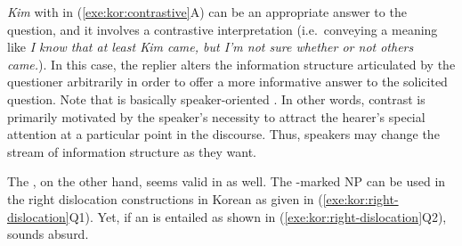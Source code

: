


\noindent \textit{Kim} with \nun in (\ref{exe:kor:contrastive}A) can
be an appropriate answer to the question, and it involves a
contrastive interpretation (i.e.\ conveying a meaning like \textit{I
  know that at least Kim came, but I'm not sure whether or not others
  came.}).  In this case, the replier alters the information
structure articulated by the questioner arbitrarily in order to offer
a more informative answer to the solicited question. Note that
 is basically speaker-oriented \citep{chang:02}. In
other words, contrast is primarily motivated by the speaker's
necessity to attract the hearer's special attention at a particular
point in the discourse. Thus, speakers may change the stream of
information structure as they want.
	
The , on the other hand, seems valid in
 as well. The \nun-marked NP can be used in the right
dislocation constructions in Korean as given in
(\ref{exe:kor:right-dislocation}Q1). Yet, if an  is
entailed as shown in (\ref{exe:kor:right-dislocation}Q2), 
 sounds absurd.



